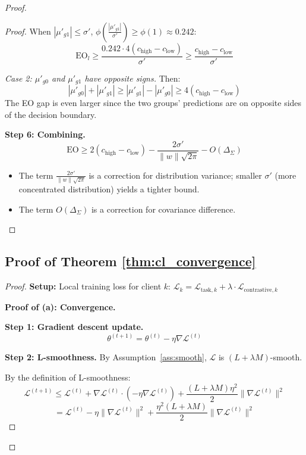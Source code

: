 \documentclass[11pt]{article}
\begin{document}
\begin{proof}
\begin{proof}
When $|\mu'_{g1}| \leq \sigma'$, $\phi\left(\frac{|\mu'_{g1}|}{\sigma'}\right) \geq \phi(1) \approx 0.242$:
$$\mathrm{EO}_l \geq \frac{0.242 \cdot 4(c_{\mathrm{high}} - c_{\mathrm{low}})}{\sigma'} \geq \frac{c_{\mathrm{high}} - c_{\mathrm{low}}}{\sigma'}$$

\textit{Case 2: $\mu'_{g0}$ and $\mu'_{g1}$ have opposite signs.} Then:
$$|\mu'_{g0}| + |\mu'_{g1}| \geq |\mu'_{g1}| - |\mu'_{g0}| \geq 4(c_{\mathrm{high}} - c_{\mathrm{low}})$$
The EO gap is even larger since the two groups' predictions are on opposite sides of the decision boundary.

\textbf{Step 6: Combining.}
$$\mathrm{EO} \geq 2(c_{\mathrm{high}} - c_{\mathrm{low}}) - \frac{2\sigma'}{\|w\|\sqrt{2\pi}} - O(\Delta_{\Sigma})$$

\begin{itemize}
    \item The term $\frac{2\sigma'}{\|w\|\sqrt{2\pi}}$ is a correction for distribution variance; smaller $\sigma'$ (more concentrated distribution) yields a tighter bound.
    \item The term $O(\Delta_{\Sigma})$ is a correction for covariance difference.
\end{itemize}
\end{proof}

\subsection{Proof of Theorem \ref{thm:cl_convergence}}

\begin{proof}
\textbf{Setup:} Local training loss for client $k$: $\mathcal{L}_k = \mathcal{L}_{\mathrm{task},k} + \lambda \cdot \mathcal{L}_{\mathrm{contrastive},k}$

\textbf{Proof of (a): Convergence.}

\textbf{Step 1: Gradient descent update.}
$$\theta^{(t+1)} = \theta^{(t)} - \eta \nabla \mathcal{L}^{(t)}$$

\textbf{Step 2: L-smoothness.} By Assumption~\ref{ass:smooth}, $\mathcal{L}$ is $(L + \lambda M)$-smooth.

By the definition of L-smoothness:
$$\mathcal{L}^{(t+1)} \leq \mathcal{L}^{(t)} + \nabla \mathcal{L}^{(t)} \cdot (-\eta \nabla \mathcal{L}^{(t)}) + \frac{(L + \lambda M) \eta^2}{2} \|\nabla \mathcal{L}^{(t)}\|^2$$
$$= \mathcal{L}^{(t)} - \eta \|\nabla \mathcal{L}^{(t)}\|^2 + \frac{\eta^2 (L + \lambda M)}{2} \|\nabla \mathcal{L}^{(t)}\|^2$$


\end{proof}
\end{proof}
\end{document}

